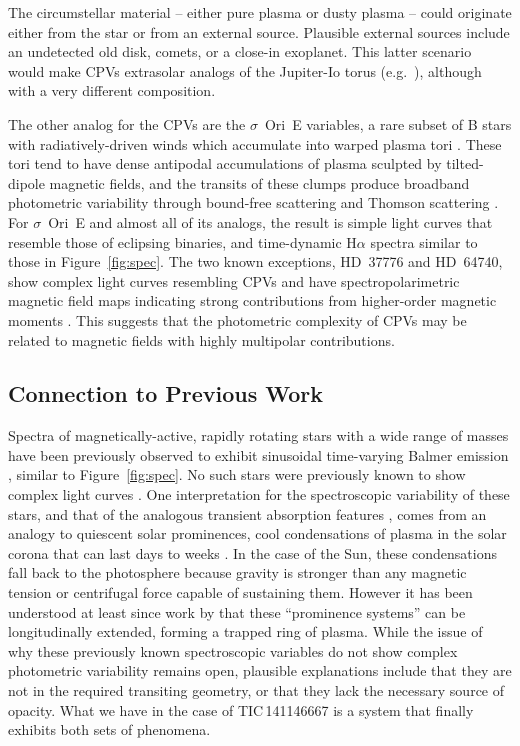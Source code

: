 \documentclass[11pt,twocolumn,tighten,linenumbers]{aastex7}
\begin{document}
The circumstellar material -- either pure plasma or dusty plasma --
could originate either from the star or from an external source.
Plausible external sources include an undetected old disk, comets, or a
close-in exoplanet.  This latter scenario would make CPVs extrasolar
analogs of the Jupiter-Io torus (e.g.~\citealt{Bagenal1981}),
although with a very different composition.

The other analog for the CPVs are the $\sigma$~Ori~E variables, a rare
subset of B stars with radiatively-driven winds which accumulate into
warped plasma tori \citep{Townsend2005}.  These tori tend
to have dense antipodal accumulations of plasma sculpted by
tilted-dipole magnetic fields, and the transits of these clumps produce
broadband photometric variability through bound-free scattering
\citep{Townsend2005} and Thomson scattering \citep{Berry2022}.  For
$\sigma$~Ori~E and almost all of its analogs, the result is simple
light curves that resemble those of eclipsing binaries, and time-dynamic
H$\alpha$ spectra similar to those in Figure~\ref{fig:spec}.  The two
known exceptions, HD~37776 and HD~64740, show complex light curves
resembling CPVs \citep{Mikulasek2020,Bouma2024} and have
spectropolarimetric magnetic field maps indicating strong contributions
from higher-order magnetic moments \citep{Kochukhov2011,Shultz2018}.
This suggests that the photometric complexity of CPVs may be related to
magnetic fields with highly multipolar contributions.  


\subsection{Connection to Previous Work}

Spectra of magnetically-active, rapidly rotating stars with a wide range
of masses have been previously observed to exhibit sinusoidal
time-varying Balmer emission
\citep{Donati2000,Townsend2005,Dunstone2006,Skelly2008}, similar to 
Figure~\ref{fig:spec}.  No such stars were previously known to show
complex light curves \citep{Bouma2024}.   One interpretation for the
spectroscopic variability of these stars, and that of the analogous
transient absorption features
\citep{CollierCameron1989,CollierCameron1992,Cang2020}, comes from an
analogy to quiescent solar prominences, cool condensations of plasma in
the solar corona that can last days to weeks \citep{VialEngvold2015}.
In the case of the Sun, these condensations fall back to the photosphere
because gravity is stronger than any magnetic tension or centrifugal
force capable of sustaining them.  However it has been understood at
least since work by \citet{Donati2000} that these ``prominence systems''
can be longitudinally extended, forming a trapped ring of plasma.  While
the issue of why these previously known spectroscopic variables do
not show complex photometric variability remains open, plausible
explanations include that they are not in the required transiting
geometry, or that they lack the necessary source of opacity.  What we
have in the case of TIC\,141146667 is a system that finally exhibits
both sets of phenomena.
\end{document}

